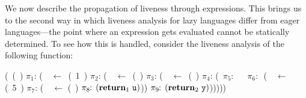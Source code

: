 \documentclass[10pt]{sigplanconf}
\begin{document}
We now describe the  propagation of liveness through expressions. This
brings  us to  the  second way  in  which liveness  analysis for  lazy
languages  differ from  eager languages---the point where  an
expression gets evaluated cannot be statically determined.  To see how
this  is handled,  consider  the liveness  analysis  of the  following
function:








\renewcommand{\arraystretch}{1}{
	  \begin{uprogram}
	  \hspace*{-.5cm} (\DEFINE\ (\pf~\pa)
	  \hspace*{-.5cm}  $\pi_1\!\!:\, $(\LET\ \px\ $\leftarrow $\ (\CONS~1~\px) \IN
	  \hspace*{-.5cm}      $\pi_2\!\!:\, $(\LET~\py\ $\leftarrow $\ (\CDR~\px) \IN  
          \hspace*{-.5cm} \hspace*{.05cm}     $\pi_3\!\!:\,
          $(\LET\ \pz\  $\leftarrow$\   (\NULLQ~\pa) \IN
	  \hspace*{-.45cm}      $\pi_4\!\!:\,
          $(\SIF\ $\pi_5\!\!:\,$ \pz\ ~$\pi_6\!\!:\,$ (\LET~\ww\  $\leftarrow$  (\take~5~\px) \IN
	  \hspace*{.45cm}     $\pi_7\!\!:\, $(\LET~\pu\  $\leftarrow$  (\CDR~\pw)  \IN
	  \hspace*{.45cm}  $\pi_8\!\!:\,(\mbox{$\mathbf{ return}$}_1~\mbox{\tt u})$))
          \hspace*{-.45cm}  $\pi_9\!\!:\, (\mbox{$\mathbf{ return}$}_2~\mbox{\tt y})$)))))
	\end{uprogram}}
\medskip
\end{document}
